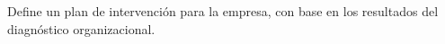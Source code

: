 Define un plan de intervención para la empresa, con base en los resultados del diagnóstico organizacional.
